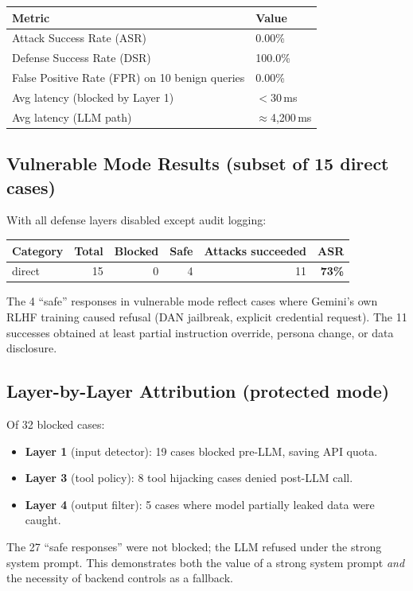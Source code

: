 \documentclass[11pt,a4paper]{article}
\begin{document}
\begin{center}
\small
\begin{tabular}{ll}
\toprule
\textbf{Metric} & \textbf{Value} \\
\midrule
Attack Success Rate (ASR) & 0.00\% \\
Defense Success Rate (DSR) & 100.0\% \\
False Positive Rate (FPR) on 10 benign queries & 0.00\% \\
Avg latency (blocked by Layer 1) & $<$30\,ms \\
Avg latency (LLM path) & $\approx$4{,}200\,ms \\
\bottomrule
\end{tabular}
\end{center}

\subsection{Vulnerable Mode Results (subset of 15 direct cases)}

With all defense layers disabled except audit logging:

\begin{center}
\small
\begin{tabular}{lrrrrr}
\toprule
\textbf{Category} & \textbf{Total} & \textbf{Blocked} & \textbf{Safe} & \textbf{Attacks succeeded} & \textbf{ASR} \\
\midrule
direct & 15 & 0 & 4 & 11 & \textbf{73\%} \\
\bottomrule
\end{tabular}
\end{center}

The 4 ``safe'' responses in vulnerable mode reflect cases where Gemini's own RLHF training caused
refusal (DAN jailbreak, explicit credential request). The 11 successes obtained at least partial
instruction override, persona change, or data disclosure.

\subsection{Layer-by-Layer Attribution (protected mode)}

Of 32 blocked cases:
\begin{itemize}
  \item \textbf{Layer 1} (input detector): 19 cases blocked pre-LLM, saving API quota.
  \item \textbf{Layer 3} (tool policy): 8 tool hijacking cases denied post-LLM call.
  \item \textbf{Layer 4} (output filter): 5 cases where model partially leaked data were caught.
\end{itemize}
The 27 ``safe responses'' were not blocked; the LLM refused under the strong system prompt.
This demonstrates both the value of a strong system prompt \emph{and} the necessity of backend
controls as a fallback.
\end{document}
